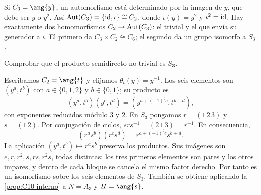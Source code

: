\begin{ejem}
Si $C_3=\ang{y}$, un automorfismo está determinado por la imagen de $y$, que debe ser $y$ o $y^2$. Así $\operatorname{Aut}(C_3)=\{\operatorname{id},\iota\}\cong C_2$, donde $\iota(y)=y^2$ y $\iota^2=\operatorname{id}$. Hay exactamente dos homomorfismos $C_2\to\operatorname{Aut}(C_3)$: el trivial y el que envía su generador a $\iota$. El primero da $C_3\times C_2\cong C_6$; el segundo da un grupo isomorfo a $S_3$.
\end{ejem}
\begin{ejer}
Comprobar que el producto semidirecto no trivial es $S_3$.
\end{ejer}
\begin{sol}
Escribamos $C_2=\ang{t}$ y elijamos $\theta_t(y)=y^{-1}$. Los seis elementos son $(y^a,t^b)$ con $a\in\{0,1,2\}$ y $b\in\{0,1\}$; su producto es
\[
(y^a,t^b)(y^c,t^d)=(y^{a+(-1)^bc},t^{b+d}),
\]
con exponentes reducidos módulo $3$ y $2$. En $S_3$ pongamos $r=(1\,2\,3)$ y $s=(1\,2)$. Por conjugación de ciclos, $srs^{-1}=(2\,1\,3)=r^{-1}$. En consecuencia,
\[
(r^as^b)(r^cs^d)=r^{a+(-1)^bc}s^{b+d}.
\]
La aplicación $(y^a,t^b)\mapsto r^as^b$ preserva los productos. Sus imágenes son $e,r,r^2,s,rs,r^2s$, todas distintas: los tres primeros elementos son pares y los otros impares, y dentro de cada bloque se cancela el mismo factor derecho. Por tanto es un isomorfismo sobre los seis elementos de $S_3$. También se obtiene aplicando la \cref{prop:C10-interno} a $N=A_3$ y $H=\ang{s}$.
\end{sol}
